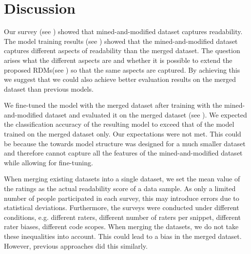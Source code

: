 \documentclass[%
class=scrreprt,
chapterprefix=false,%
open=right,%
twoside=false,%
paper=a4,%
logofile={Logo\_zentral\_farbig\_EN.png},%
thesistype=master,%
UKenglish,%
]{se2thesis}
\theoremstyle{definition}
\newcommand{\citeolddataset}{\cite{buse2009learning, dorn2012general, scalabrino2018comprehensive}\xspace}
\newcommand{\rdhs}{RDMs\xspace}
\begin{document}
	
\section{Discussion} \label{Discussion}

	Our survey (see ) showed that mined-and-modified dataset captures readability. The model training results (see ) showed that the mined-and-modified dataset captures different aspects of readability than the merged dataset. 	
	The question arises what the different aspects are and whether it is possible to extend the proposed \rdhs (see ) so that the same aspects are captured. By achieving this we suggest that we could also achieve better evaluation results on the merged dataset than previous models.
	
	We fine-tuned the model with the merged dataset after training with the mined-and-modified dataset and evaluated it on the merged dataset (see ). We expected the classification accuracy of the resulting model to exceed that of the model trained on the merged dataset only.
	Our expectations were not met. This could be because the towards model structure was designed for a much smaller dataset and therefore cannot capture all the features of the mined-and-modified dataset while allowing for fine-tuning.

	When merging existing datasets \citeolddataset into a single dataset, we set the mean value of the ratings as the actual readability score of a data sample. As only a limited number of people participated in each survey, this may introduce errors due to statistical deviations.
	Furthermore, the surveys were conducted under different conditions, e.g. different raters, different number of raters per snippet, different rater biases, different code scopes. When merging the datasets, we do not take these inequalities into account. This could lead to a bias in the merged dataset. However, previous approaches did this similarly.
	
\end{document}
